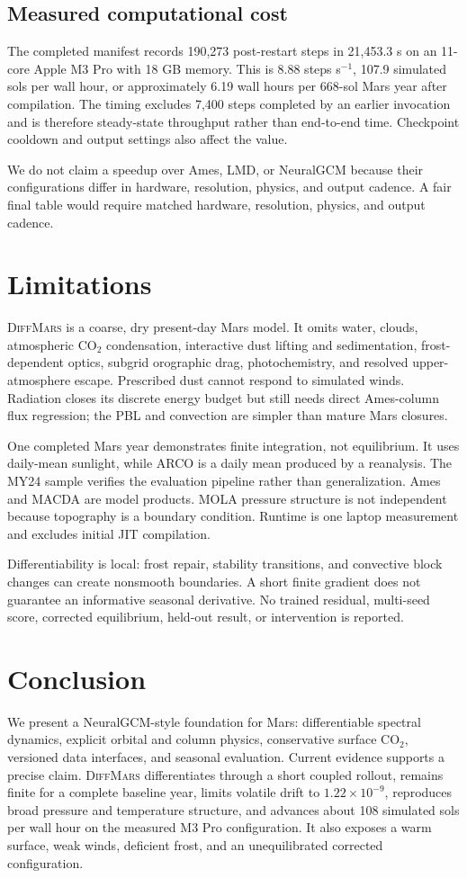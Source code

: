 \documentclass{article}
\newcommand{\model}{\textsc{DiffMars}}
\begin{document}
\subsection{Measured computational cost}
The completed manifest records 190,273 post-restart steps in 21,453.3 s on an
11-core Apple M3 Pro with 18 GB memory. This is 8.88 steps s\(^{-1}\), 107.9
simulated sols per wall hour, or approximately 6.19 wall hours per 668-sol Mars
year after compilation. The timing excludes 7,400 steps completed by an earlier
invocation and is therefore steady-state throughput rather than end-to-end time.
Checkpoint cooldown and output settings also affect the value.

We do not claim a speedup over Ames, LMD, or NeuralGCM because their configurations
differ in hardware, resolution, physics, and output cadence. A fair final table
would require matched hardware, resolution, physics, and output cadence.

\section{Limitations}
\model{} is a coarse, dry present-day Mars model. It omits water, clouds,
atmospheric \(\mathrm{CO_2}\) condensation, interactive dust lifting and
sedimentation, frost-dependent optics, subgrid orographic drag, photochemistry,
and resolved upper-atmosphere escape. Prescribed dust cannot respond to simulated
winds. Radiation closes its discrete energy budget but still needs direct
Ames-column flux regression; the PBL and convection are simpler than mature
Mars closures.

One completed Mars year demonstrates finite integration, not equilibrium. It
uses daily-mean sunlight, while ARCO is a daily mean produced by a reanalysis.
The MY24 sample verifies the evaluation pipeline rather than generalization.
Ames and MACDA are model products. MOLA pressure structure is
not independent because topography is a boundary condition. Runtime is one
laptop measurement and excludes initial JIT compilation.

Differentiability is local: frost repair, stability transitions, and convective
block changes can create nonsmooth boundaries. A short finite gradient does not
guarantee an informative seasonal derivative. No trained residual, multi-seed
score, corrected equilibrium, held-out result, or intervention is reported.

\section{Conclusion}
We present a NeuralGCM-style foundation for Mars: differentiable spectral
dynamics, explicit orbital and column physics, conservative surface
\(\mathrm{CO_2}\), versioned data interfaces, and seasonal evaluation. Current
evidence supports a precise claim. \model{} differentiates through a short
coupled rollout, remains finite for a complete baseline year, limits volatile
drift to \(1.22\times10^{-9}\), reproduces broad pressure and temperature
structure, and advances about 108 simulated sols per wall hour on the measured
M3 Pro configuration. It also exposes a warm surface, weak winds, deficient
frost, and an unequilibrated corrected configuration.
\end{document}
